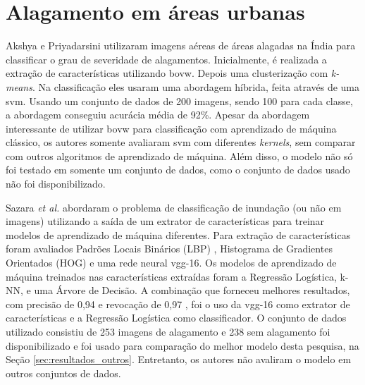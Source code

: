 \section{Alagamento em áreas urbanas}\label{sec:trabalhos_alagamento}
Akshya e Priyadarsini \cite{akshya2019} utilizaram imagens aéreas de áreas alagadas na Índia para classificar o grau de severidade de alagamentos. 
Inicialmente, é realizada a extração de características utilizando \acrfull{bovw}. Depois uma clusterização com \textit{k-means}. 
Na classificação eles usaram uma abordagem híbrida, feita através de uma \acrshort{svm}. 
Usando um conjunto de dados de 200 imagens, sendo 100 para cada classe, a abordagem conseguiu acurácia média de 92\%.
Apesar da abordagem interessante de utilizar \Acrshort{bovw} para classificação com aprendizado de máquina clássico, os autores somente avaliaram \acrshort{svm} com diferentes \textit{kernels},
sem comparar com outros algoritmos de aprendizado de máquina. Além disso, o modelo não só foi testado em somente um conjunto de dados, como o conjunto de dados usado não foi disponibilizado.




Sazara \textit{et al.} \cite{sazara2019} abordaram o problema de classificação de inundação (ou não em imagens) utilizando a saída de um extrator de características para treinar modelos de aprendizado de máquina diferentes. 
Para extração de características foram avaliados Padrões Locais Binários (LBP) , Histograma de Gradientes Orientados (HOG) e uma rede neural \acrshort{vgg}-16. 
Os modelos de aprendizado de máquina treinados nas características extraídas foram a Regressão Logística, k-NN, e uma Árvore de Decisão. 
A combinação que forneceu melhores resultados, com precisão de 0,94 e revocação de 0,97 , 
foi o uso da \acrshort{vgg}-16 como extrator de características e a Regressão Logística como classificador. 
O conjunto de dados utilizado consistiu de 253 imagens de alagamento e 238 sem alagamento foi disponibilizado e foi usado para comparação do melhor modelo desta pesquisa, na Seção \ref{sec:resultados_outros}.
Entretanto, os autores não avaliram o modelo em outros conjuntos de dados.

